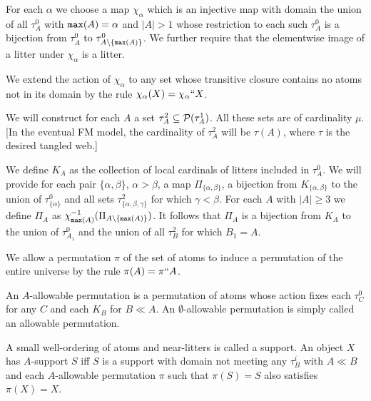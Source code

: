 \documentclass{slides}
\begin{document}
\begin{slide}

For each $\alpha$ we choose a map $\chi_\alpha$ which is an injective map with domain the union of all $\tau^0_A$ with ${\tt max}(A)=\alpha$ and $|A|>1$ whose restriction
to each such $\tau^0_A$ is a bijection from $\tau^0_A$ to $\tau^0_{A\setminus \{{\tt max}(A)\}}$.  We further require that the elementwise image of a litter under $\chi_\alpha$ is a litter.

We extend the action of $\chi_\alpha$ to any set whose transitive closure contains no atoms not in its domain by the rule $\chi_\alpha(X) = \chi_\alpha``X$.

\end{slide}

\begin{slide}

We will construct for each $A$ a set $\tau^2_A \subseteq {\cal P}(\tau^1_A)$.  All these sets are of cardinality $\mu$.   [In the eventual FM model, the cardinality of $\tau^2_A$ will be $\tau(A)$, where $\tau$ is the desired tangled web.]

We define $K_A$ as the collection of local cardinals of litters included in $\tau^0_A$.  We will provide for each pair $\{\alpha,\beta\}$, $\alpha>\beta$, a map $\Pi_{\{\alpha,\beta\}}$, a bijection from $K_{\{\alpha,\beta\}}$ to the union of
$\tau^0_{\{\alpha\}}$ and all sets $\tau^2_{\{\alpha,\beta,\gamma\}}$ for which $\gamma<\beta$.  For each $A$ with $|A|\geq 3$ we define $\Pi_A$ as $\chi_{{\tt max}(A)}^{-1}(\Pi_{A \setminus \{{\tt max}(A)\}})$.  It follows that $\Pi_A$ is a bijection from $K_A$ to the union of $\tau^0_{A_1}$ and the union of all $\tau^2_B$ for which $B_1=A$.

\end{slide}

\begin{slide}

We allow a permutation $\pi$ of the set of atoms to induce a permutation of the entire universe by the rule $\pi(A) =\pi``A$.

An $A$-allowable permutation is a permutation of atoms whose action fixes each $\tau^0_C$ for any $C$ and each $K_B$ for $B \ll A$.  An $\emptyset$-allowable permutation
is simply called an allowable permutation.

A small well-ordering of atoms and near-litters is called a support.   An object $X$ has $A$-support $S$ iff $S$ is a support with domain not meeting any  $\tau^i_B$ with $A \ll B$  and each $A$-allowable permutation $\pi$ such that $\pi(S)=S$ also
satisfies $\pi(X)=X$.

\end{slide}
\end{document}
